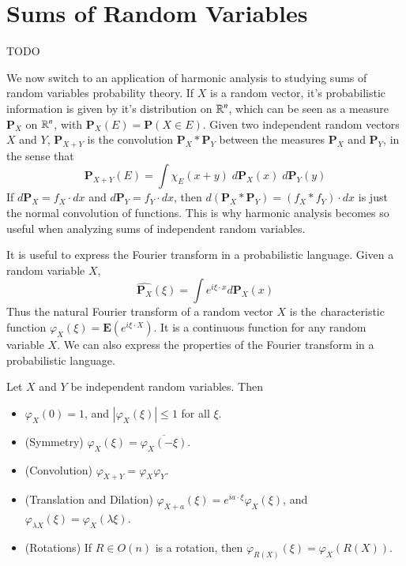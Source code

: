 \section{Sums of Random Variables}

TODO

We now switch to an application of harmonic analysis to studying sums of random variables probability theory. If $X$ is a random vector, it's probabilistic information is given by it's distribution on $\operatorname{\mathbb{R}}^n$, which can be seen as a measure $\mathbf{P}_X$ on $\operatorname{\mathbb{R}}^n$, with $\mathbf{P}_X(E) = \mathbf{P}(X \in E)$. Given two independent random vectors $X$ and $Y$, $\mathbf{P}_{X+Y}$ is the convolution $\mathbf{P}_X * \mathbf{P}_Y$ between the measures $\mathbf{P}_X$ and $\mathbf{P}_Y$, in the sense that
%
\[ \mathbf{P}_{X+Y}(E) = \int \chi_E(x+y)\; d\mathbf{P}_X(x)\; d\mathbf{P}_Y(y) \]
%
If $d\mathbf{P}_X = f_X \cdot dx$ and $d\mathbf{P}_Y = f_Y \cdot dx$, then $d(\mathbf{P}_X * \mathbf{P}_Y) = (f_X * f_Y) \cdot dx$ is just the normal convolution of functions. This is why harmonic analysis becomes so useful when analyzing sums of independent random variables.

It is useful to express the Fourier transform in a probabilistic language. Given a random variable $X$,
%
\[ \widehat{\mathbf{P}_X}(\xi) = \int e^{i \xi \cdot x} d\mathbf{P}_X(x) \]
%
Thus the natural Fourier transform of a random vector $X$ is the {\emph characteristic function} $\varphi_X(\xi) = \mathbf{E}(e^{i \xi \cdot X})$. It is a continuous function for any random variable $X$. We can also express the properties of the Fourier transform in a probabilistic language.

\begin{lemma}
    Let $X$ and $Y$ be independent random variables. Then
    \begin{itemize}
        \item $\varphi_X(0) = 1$, and $|\varphi_X(\xi)| \leq 1$ for all $\xi$.

        \item (Symmetry) $\varphi_X(\xi) = \overline{\varphi_X(-\xi)}$.

        \item (Convolution) $\varphi_{X+Y} = \varphi_X \varphi_Y$.

        \item (Translation and Dilation) $\varphi_{X+a}(\xi) = e^{i a \cdot \xi} \varphi_X(\xi)$, and $\varphi_{\lambda X}(\xi) = \varphi_X(\lambda \xi)$.

        \item (Rotations) If $R \in O(n)$ is a rotation, then $\varphi_{R(X)}(\xi) = \varphi_X(R(X))$.
    \end{itemize}
\end{lemma}

